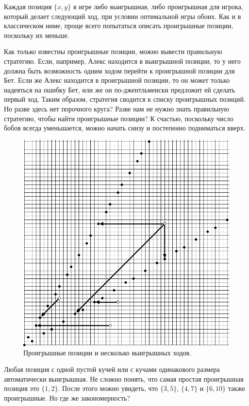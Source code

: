 Каждая позиция $\{x, y\}$ в игре либо выигрышная, либо проигрышная для игрока, который делает следующий ход, при условии оптимальной игры обоих.
Как и в классическом ниме, проще всего попытаться описать проигрышные позиции, поскольку их меньше.

Как только известны проигрышные позиции, можно вывести правильную стратегию.
Если, например, Алекс находится в выигрышной позиции, то у него должна быть возможность одним ходом перейти к проигрышной позиции для Бет.
Если же Алекс находится в проигрышной позиции, то он может только надеяться на ошибку Бет, или же он по-джентльменски предложит ей сделать первый ход.
Таким образом, стратегия сводится к списку проигрышных позиций.
Но разве здесь нет порочного круга?
Разве нам не нужно знать правильную стратегию, чтобы найти проигрышные позиции?
К счастью, поскольку число бобов всегда уменьшается, можно начать снизу и постепенно подниматься вверх.

\begin{figure}[!b]
\vskip-0mm
\centering
\includegraphics{mppics/pic-5}
\vskip-0mm
\caption{Проигрышные позиции и несколько выигрышных ходов.}
\label{pic:nim}
\end{figure}

Любая позиция с одной пустой кучей или с кучами одинакового размера автоматически выигрышная.
Не сложно понять, что самая простая проигрышная позиция это $\{1, 2\}$.
После этого можно увидеть, что $\{3, 5\}$, $\{4, 7\}$ и $\{6, 10\}$ также проигрышные.
Но где же закономерность?

